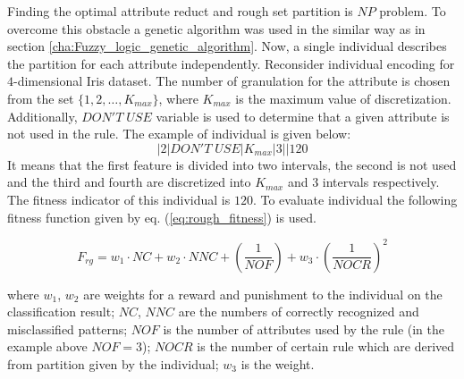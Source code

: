 Finding the optimal attribute reduct and rough set partition is $NP$ problem.
To overcome this obstacle a genetic algorithm was used in the similar way as in section
\ref{cha:Fuzzy_logic_genetic_algorithm}. Now, a single individual describes the
partition for each attribute independently. Reconsider individual encoding for
$4$-dimensional Iris dataset. The number of granulation for the attribute is
chosen from the set $\{1, 2, \ldots, K_{max}\}$, where $K_{max}$ is the maximum
value of discretization. Additionally, $DON'T\; USE$ variable is used to
determine that a given attribute is not used in the rule. The example of
individual is given below:
$$|2|DON'T \; USE|K_{max}|3||120$$
It means that the first feature is divided into two intervals, the second is
not used and the third and fourth are discretized into $K_{max}$ and 3
intervals respectively. The fitness indicator of this individual is $120$.
To evaluate individual the following fitness function given by eq.
(\ref{eq:rough_fitness}) is used.

\begin{equation}
    F_{rg} = w_1\cdot NC + w_2\cdot NNC + (\frac{1}{NOF}) +w_3\cdot (\frac{1}{NOCR})^2
    \label{eq:rough_fitness}
\end{equation}

where $w_1$, $w_2$ are weights for a reward and punishment to
the individual on the classification result; $NC$, $NNC$ are
the numbers of correctly recognized and misclassified patterns; $NOF$ is the number of
attributes used by the rule (in the example above $NOF=3$);
$NOCR$ is the number of certain rule which are derived from
partition given by the individual; $w_3$ is the weight.

